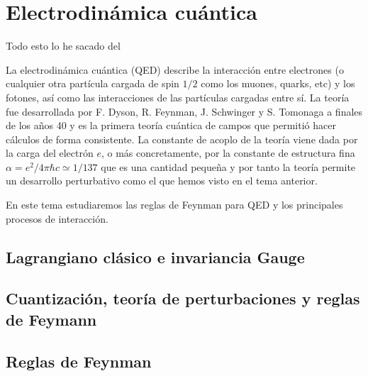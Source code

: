 \setchapterpreamble[u]{\margintoc}
\chapter{Electrodinámica cuántica}

\begin{center}
  \large Todo esto lo he sacado del \cite{Dobdado}
\end{center}
La electrodinámica cuántica (QED) describe la interacción entre electrones (o cualquier otra partícula cargada de spin $1 / 2$ como los muones, quarks, etc) y los fotones, así como las interacciones de las partículas cargadas entre sí. La teoría fue desarrollada por F. Dyson, R. Feynman, J. Schwinger y S. Tomonaga a finales de los años 40 y es la primera teoría cuántica de campos que permitió hacer cálculos de forma consistente. La constante de acoplo de la teoría viene dada por la carga del electrón $e$, o más concretamente, por la constante de estructura fina $\alpha=e^{2} / 4 \pi \hbar c \simeq 1 / 137$ que es una cantidad pequeña y por tanto la teoría permite un desarrollo perturbativo como el que hemos visto en el tema anterior.

En este tema estudiaremos las reglas de Feynman para QED y los principales procesos de interacción.
\section{Lagrangiano clásico e invariancia Gauge}
\section{Cuantización, teoría de perturbaciones y reglas de Feymann}
\section{Reglas de Feynman}
